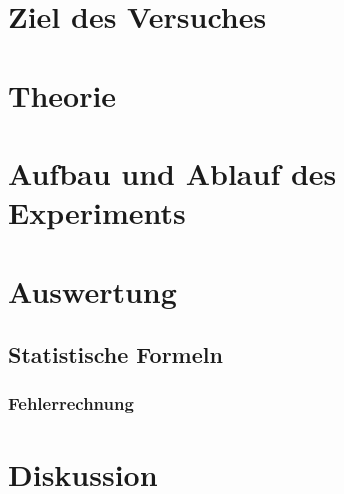 \documentclass[a4,12pt]{article}
\begin{document}



\tableofcontents
\newpage

\section{Ziel des Versuches}



\section{Theorie}


\section{Aufbau und Ablauf des Experiments}

\clearpage


\section{Auswertung}
\subsection{Statistische Formeln}
\subsubsection{Fehlerrechnung}
\label{sec:Fehlerrechnung}

%
\clearpage


\clearpage


\section{Diskussion}

\end{document}
